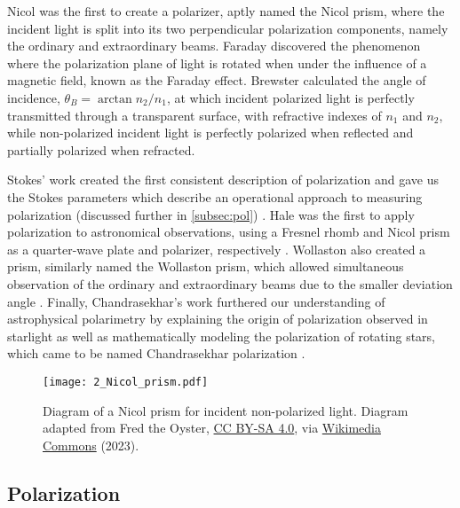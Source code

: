 Nicol was the first to create a polarizer, aptly named the Nicol prism, where the incident light is split into its two perpendicular polarization components, namely the ordinary and extraordinary beams. Faraday discovered the phenomenon where the polarization plane of light is rotated when under the influence of a magnetic field, known as the Faraday effect. Brewster calculated the angle of incidence, $\theta_{B} = \arctan{n_{2} / n_{1}}$, at which incident polarized light is perfectly transmitted through a transparent surface, with refractive indexes of $n_{1}$ and $n_{2}$, while non-polarized incident light is perfectly polarized when reflected and partially polarized when refracted.

\pagebreak

Stokes' work created the first consistent description of polarization and gave us the Stokes parameters which describe an operational approach to measuring polarization (discussed further in \autoref{subsec:pol}) \citep{Stokes}. Hale was the first to apply polarization to astronomical observations, using a Fresnel rhomb and Nicol prism as a quarter-wave plate and polarizer, respectively \citep{Hale_pre,Hale_post}. Wollaston also created a prism, similarly named the Wollaston prism, which allowed simultaneous observation of the ordinary and extraordinary beams due to the smaller deviation angle \citep{WollPrism}. Finally, Chandrasekhar's work furthered our understanding of astrophysical polarimetry by explaining the origin of polarization observed in starlight as well as mathematically modeling the polarization of rotating stars, which came to be named Chandrasekhar polarization \citep{chandrasekhar}.

\begin{figure}[t]
    \centering
    \texttt{[image: 2\_Nicol\_prism.pdf]}
    \caption{Diagram of a Nicol prism for incident non-polarized light. Diagram adapted from Fred the Oyster, \protect\href{https://creativecommons.org/licenses/by-sa/4.0/}{CC BY-SA 4.0}, via \protect\href{https://en.m.wikipedia.org/wiki/File:Nicol_prism.svg}{Wikimedia Commons} (2023).}
    \label{fig:Nicol_prism}
\end{figure}

\subsection{Polarization} \label{subsec:pol}

